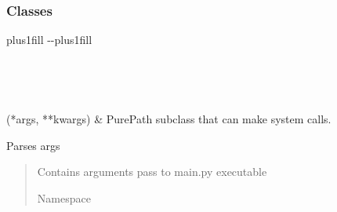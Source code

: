 \documentclass[letterpaper,10pt,english]{sphinxmanual}
\begin{document}
\subsubsection*{Classes}


\begin{savenotes}
\sphinxatlongtablestart
\sphinxthistablewithglobalstyle
\sphinxthistablewithnovlinesstyle
\makeatletter
  \LTleft \@totalleftmargin plus1fill
  \LTright\dimexpr\columnwidth-\@totalleftmargin-\linewidth\relax plus1fill
\makeatother
\begin{longtable}{}
\sphinxtoprule
\endfirsthead

\\
\sphinxtoprule
\endhead

\sphinxbottomrule
{}\\
\endfoot

\endlastfoot
\sphinxtableatstartofbodyhook

\sphinxAtStartPar
{}(*args, **kwargs)
&
\sphinxAtStartPar
PurePath subclass that can make system calls.
\\
\sphinxbottomrule
\end{longtable}
\sphinxtableafterendhook
\sphinxatlongtableend
\end{savenotes}

\begin{fulllineitems}
\label{\detokenize{src.common.utilities:src.common.utilities.get_args}}
\pysigstartsignatures
\pysiglinewithargsret
{}
{}
{}
\pysigstopsignatures
\sphinxAtStartPar
Parses args
\begin{quote}\begin{description}
\sphinxAtStartPar
{} \textendash{} Contains arguments pass to main.py executable

\sphinxAtStartPar
Namespace

\end{description}\end{quote}

\end{fulllineitems}
\end{document}
